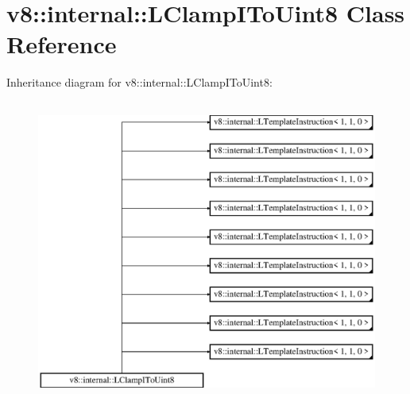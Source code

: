\hypertarget{classv8_1_1internal_1_1_l_clamp_i_to_uint8}{}\section{v8\+:\+:internal\+:\+:L\+Clamp\+I\+To\+Uint8 Class Reference}
\label{classv8_1_1internal_1_1_l_clamp_i_to_uint8}
Inheritance diagram for v8\+:\+:internal\+:\+:L\+Clamp\+I\+To\+Uint8\+:\begin{figure}[H]
\begin{center}
\leavevmode
\includegraphics[height=10.000000cm]{classv8_1_1internal_1_1_l_clamp_i_to_uint8}
\end{center}
\end{figure}
